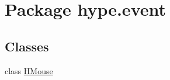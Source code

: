 \hypertarget{namespacehype_1_1event}{\section{Package hype.\-event}
\label{namespacehype_1_1event}
}
\subsection*{Classes}
\begin{DoxyCompactItemize}
\item 
class \hyperlink{classhype_1_1event_1_1_h_mouse}{H\-Mouse}
\end{DoxyCompactItemize}
